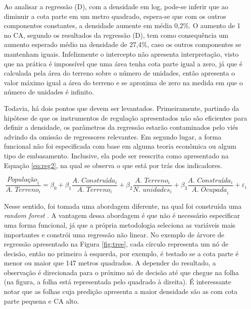 Ao analisar a regressão (D), com a densidade em log, pode-se inferir que ao diminuir a cota parte em um metro quadrado, espera-se que com os outros componentes constantes, a densidade aumente em média 0,2\%. O aumento de 1 no CA, segundo os resultados da regressão (D), tem como consequência um aumento esperado médio na densidade de 27,4\%, caso os outros componentes se mantenham iguais. Infelizmente o intercepto não apresenta interpretação, visto que na prática é impossível que uma área tenha cota parte igual a zero, já que é calculada pela área do terreno sobre o número de unidades, então apresenta o valor máximo igual a área do terreno e se aproxima de zero na medida em que o número de unidades é infinito. 

Todavia, há dois pontos que devem ser levantados. Primeiramente, partindo da hipótese de que os instrumentos de regulação apresentados não são eficientes para definir a densidade, os parâmetros da regressão estarão contaminados pelo viés advindo da omissão de regressores relevantes. Em segundo lugar, a forma funcional não foi especificada com base em alguma teoria econômica ou algum tipo de embasamento. Inclusive, ela pode ser reescrita como apresentado na Equação \ref{eq:reg2}, na qual se observa o que está por trás dos indicadores.

\begin{equation}
    \frac{\textit{População}_i}{\textit{A. Terreno}_i}=\beta_0+\beta_1\frac{\textit{A. Construída}_i}{\textit{A. Terreno}_i}+\beta_2\frac{\textit{A. Terreno}_i}{\textit{N. unidades}_i}+\beta_3\frac{\textit{A. Construída}_i}{\textit{A. Ocupada}_i}+\varepsilon_i
    \label{eq:reg2}
\end{equation}

Nesse sentido, foi tomada uma abordagem diferente, na qual foi construída uma \textit{random forest} \cite{wright2015ranger}. A vantagem dessa abordagem é que não é necessário especificar uma forma funcional, já que a própria metodologia seleciona as variáveis mais importantes e constrói uma regressão não linear. No exemplo de árvore de regressão apresentado na Figura \ref{fig:tree}, cada círculo representa um nó de decisão, então no primeiro à esquerda, por exemplo, é testado se a cota parte é menor ou maior que 147 metros quadrados. A depender do resultado, a observação é direcionada para o próximo nó de decisão até que chegue na folha (na figura, a folha está representada pelo quadrado à direita). É interessante notar que as folhas cuja predição apresenta a maior densidade são as com cota parte pequena e CA alto.

